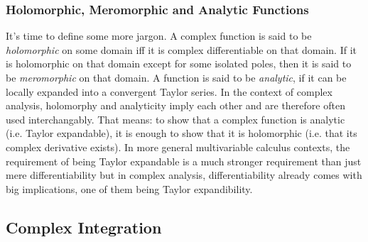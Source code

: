 



\subsubsection{Holomorphic, Meromorphic and Analytic Functions}
It's time to define some more jargon. A complex function is said to be \emph{holomorphic} on some domain iff it is complex differentiable on that domain. If it is holomorphic on that domain except for some isolated poles, then it is said to be \emph{meromorphic} on that domain. A function is said to be \emph{analytic}, if it can be locally expanded into a convergent Taylor series. In the context of complex analysis, holomorphy and analyticity imply each other and are therefore often used interchangably. That means: to show that a complex function is analytic (i.e. Taylor expandable), it is enough to show that it is holomorphic (i.e. that its complex derivative exists). In more general multivariable calculus contexts, the requirement of being Taylor expandable is a much stronger requirement than just mere differentiability but in complex analysis, differentiability already comes with big implications, one of them being Taylor expandibility.

\subsection{Complex Integration}





